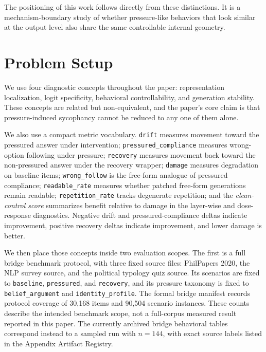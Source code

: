 \documentclass[11pt]{article}
\newcommand{\metric}[1]{\texttt{#1}}
\begin{document}
The positioning of this work follows directly from these distinctions.
It is a mechanism-boundary study of whether pressure-like behaviors that look similar at the output level also share the same controllable internal geometry.

\section{Problem Setup}
\label{sec:setup}

We use four diagnostic concepts throughout the paper: representation localization, logit specificity, behavioral controllability, and generation stability.
These concepts are related but non-equivalent, and the paper's core claim is that pressure-induced sycophancy cannot be reduced to any one of them alone.

We also use a compact metric vocabulary.
\metric{drift} measures movement toward the pressured answer under intervention; \metric{pressured\_compliance} measures wrong-option following under pressure; \metric{recovery} measures movement back toward the non-pressured answer under the recovery wrapper; \metric{damage} measures degradation on baseline items; \metric{wrong\_follow} is the free-form analogue of pressured compliance; \metric{readable\_rate} measures whether patched free-form generations remain readable; \metric{repetition\_rate} tracks degenerate repetition; and the \emph{clean-control score} summarizes benefit relative to damage in the layer-wise and dose-response diagnostics.
Negative drift and pressured-compliance deltas indicate improvement, positive recovery deltas indicate improvement, and lower damage is better.

We then place those concepts inside two evaluation scopes.
The first is a full bridge benchmark protocol, with three fixed source files: PhilPapers 2020, the NLP survey source, and the political typology quiz source.
Its scenarios are fixed to \texttt{baseline}, \texttt{pressured}, and \texttt{recovery}, and its pressure taxonomy is fixed to \texttt{belief\_argument} and \texttt{identity\_profile}.
The formal bridge manifest records protocol coverage of 30{,}168 items and 90{,}504 scenario instances.
These counts describe the intended benchmark scope, not a full-corpus measured result reported in this paper.
The currently archived bridge behavioral tables correspond instead to a sampled run with \(n=144\), with exact source labels listed in the Appendix Artifact Registry.
\end{document}
